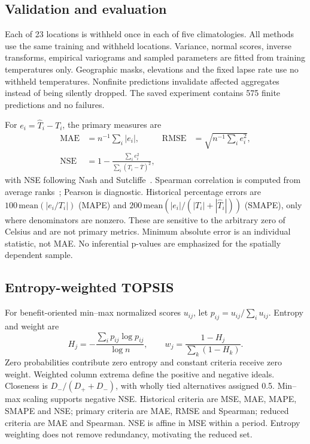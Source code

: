 \documentclass[11pt,a4paper]{article}
\begin{document}
\subsection{Validation and evaluation}
Each of 23 locations is withheld once in each of five climatologies. All methods use the same training and withheld locations. Variance, normal scores, inverse transforms, empirical variograms and sampled parameters are fitted from training temperatures only. Geographic masks, elevations and the fixed lapse rate use no withheld temperatures. Nonfinite predictions invalidate affected aggregates instead of being silently dropped. The saved experiment contains 575 finite predictions and no failures.

For $e_i=\widehat T_i-T_i$, the primary measures are
\begin{align}
\mathrm{MAE}&=n^{-1}\sum_i|e_i|, &\mathrm{RMSE}&=\sqrt{n^{-1}\sum_i e_i^2},\\
\mathrm{NSE}&=1-\frac{\sum_i e_i^2}{\sum_i(T_i-\overline T)^2},
\end{align}
with NSE following Nash and Sutcliffe~\cite{nash}. Spearman correlation is computed from average ranks~\cite{spearman}; Pearson is diagnostic. Historical percentage errors are $100\,\mathrm{mean}(|e_i/T_i|)$ (MAPE) and $200\,\mathrm{mean}(|e_i|/(|T_i|+|\widehat T_i|))$ (SMAPE), only where denominators are nonzero. These are sensitive to the arbitrary zero of Celsius and are not primary metrics. Minimum absolute error is an individual statistic, not MAE. No inferential p-values are emphasized for the spatially dependent sample.

\subsection{Entropy-weighted TOPSIS}
For benefit-oriented min--max normalized scores $u_{ij}$, let $p_{ij}=u_{ij}/\sum_i u_{ij}$. Entropy and weight are
\begin{equation}
H_j=-\frac{\sum_i p_{ij}\log p_{ij}}{\log n},\qquad w_j=\frac{1-H_j}{\sum_k(1-H_k)}.
\end{equation}
Zero probabilities contribute zero entropy and constant criteria receive zero weight. Weighted column extrema define the positive and negative ideals. Closeness is $D_-/(D_++D_-)$, with wholly tied alternatives assigned 0.5. Min--max scaling supports negative NSE. Historical criteria are MSE, MAE, MAPE, SMAPE and NSE; primary criteria are MAE, RMSE and Spearman; reduced criteria are MAE and Spearman. NSE is affine in MSE within a period. Entropy weighting does not remove redundancy, motivating the reduced set.
\end{document}

